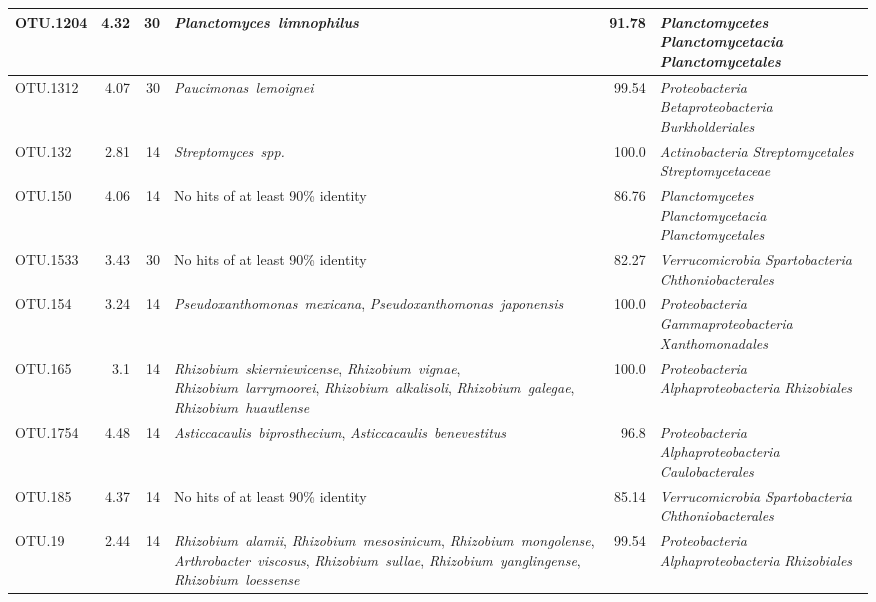 \begin{ThreePartTable}
\begin{longtable}{lrrP{5cm}rP{5cm}}
OTU.1204 & 4.32 & 30 & \mbox{\textit{Planctomyces limnophilus}} & 91.78 & \mbox{\textit{Planctomycetes}} \mbox{\textit{Planctomycetacia}} \mbox{\textit{Planctomycetales}} \\ \midrule
OTU.1312 & 4.07 & 30 & \mbox{\textit{Paucimonas lemoignei}} & 99.54 & \mbox{\textit{Proteobacteria}} \mbox{\textit{Betaproteobacteria}} \mbox{\textit{Burkholderiales}} \\ \midrule
OTU.132 & 2.81 & 14 & \mbox{\textit{Streptomyces spp.}} & 100.0 & \mbox{\textit{Actinobacteria}} \mbox{\textit{Streptomycetales}} \mbox{\textit{Streptomycetaceae}} \\ \midrule
OTU.150 & 4.06 & 14 & {No hits of at least 90\% identity} & 86.76 & \mbox{\textit{Planctomycetes}} \mbox{\textit{Planctomycetacia}} \mbox{\textit{Planctomycetales}} \\ \midrule
OTU.1533 & 3.43 & 30 & {No hits of at least 90\% identity} & 82.27 & \mbox{\textit{Verrucomicrobia}} \mbox{\textit{Spartobacteria}} \mbox{\textit{Chthoniobacterales}} \\ \midrule
OTU.154 & 3.24 & 14 & \mbox{\textit{Pseudoxanthomonas mexicana}}, \mbox{\textit{Pseudoxanthomonas japonensis}} & 100.0 & \mbox{\textit{Proteobacteria}} \mbox{\textit{Gammaproteobacteria}} \mbox{\textit{Xanthomonadales}} \\ \midrule
OTU.165 & 3.1 & 14 & \mbox{\textit{Rhizobium skierniewicense}}, \mbox{\textit{Rhizobium vignae}}, \mbox{\textit{Rhizobium larrymoorei}}, \mbox{\textit{Rhizobium alkalisoli}}, \mbox{\textit{Rhizobium galegae}}, \mbox{\textit{Rhizobium huautlense}} & 100.0 & \mbox{\textit{Proteobacteria}} \mbox{\textit{Alphaproteobacteria}} \mbox{\textit{Rhizobiales}} \\ \midrule
OTU.1754 & 4.48 & 14 & \mbox{\textit{Asticcacaulis biprosthecium}}, \mbox{\textit{Asticcacaulis benevestitus}} & 96.8 & \mbox{\textit{Proteobacteria}} \mbox{\textit{Alphaproteobacteria}} \mbox{\textit{Caulobacterales}} \\ \midrule
OTU.185 & 4.37 & 14 & {No hits of at least 90\% identity} & 85.14 & \mbox{\textit{Verrucomicrobia}} \mbox{\textit{Spartobacteria}} \mbox{\textit{Chthoniobacterales}} \\ \midrule
OTU.19 & 2.44 & 14 & \mbox{\textit{Rhizobium alamii}}, \mbox{\textit{Rhizobium mesosinicum}}, \mbox{\textit{Rhizobium mongolense}}, \mbox{\textit{Arthrobacter viscosus}}, \mbox{\textit{Rhizobium sullae}}, \mbox{\textit{Rhizobium yanglingense}}, \mbox{\textit{Rhizobium loessense}} & 99.54 & \mbox{\textit{Proteobacteria}} \mbox{\textit{Alphaproteobacteria}} \mbox{\textit{Rhizobiales}} \\ \midrule

\end{longtable}
\end{ThreePartTable}
